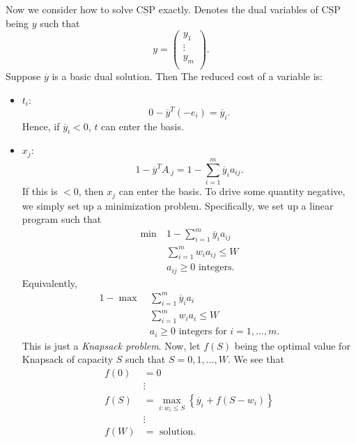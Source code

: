 \begin{problem}
\begin{answer}
	Now we consider how to solve \(\mathrm{\underline{CSP}}\) exactly. Denotes the dual variables of \(\mathrm{\underline{CSP}}\) being \(y\)
	such that
	\[
		y = \begin{pmatrix}
			y_1    \\
			\vdots \\
			y_{m}  \\
		\end{pmatrix}.
	\]
	Suppose \(\overline{y}\) is a basic dual solution. Then The reduced cost of a variable is:
	\begin{itemize}
		\item \(t_{i}\):
		      \[
			      0 - \overline{y}^{T}(-e_{i}) = \overline{y}_{i}.
		      \]
		      Hence, if \(\overline{y}_{i}<0\), \(t\) can enter the basis.
		\item \(x_{j}\):
		      \[
			      1 - \overline{y}^{T}A_{\cdot j} = 1 - \sum\limits_{i=1}^{m} \overline{y}_{i}a_{ij}.
		      \]
		      If this is \(<0\), then \(x_{j}\) can enter the basis. To drive some quantity negative, we simply set up a minimization problem.
		      Specifically, we set up a linear program such that
		      \begin{align*}
			      \min~ & 1 - \sum\limits_{i=1}^{m} \overline{y}_{i}a_{ij} \\
			            & \sum\limits_{i=1}^{m} w_{i}a_{ij}\leq W          \\
			            & a_{ij}\geq 0 \text{ integers}.
		      \end{align*}
		      Equivalently,
		      \begin{align*}
			      1 - \max~ & \sum\limits_{i=1}^{m} \overline{y}_{i}a_{i}         \\
			                & \sum\limits_{i=1}^{m} w_{i}a_{i}\leq W              \\
			                & a_{i}\geq 0 \text{ integers for }i = 1, \ldots , m.
		      \end{align*}
		      This is just a \emph{Knapsack problem}. Now, let \(f(S)\) being the optimal value for Knapsack of capacity \(S\) such that
		      \(S = 0, 1, \ldots , W\). We see that
		      \[
			      \begin{split}
				      f(0) &= 0\\
				      &\vdots\\
				      f(S) &= \max_{i\colon w_{i}\leq S}\left\{ \overline{y}_{i} + f(S - w_{i})\right\}\\
				      &\vdots\\
				      f(W) &= \text{ solution}.\\

\end{split}\]
\end{itemize}
\end{answer}
\end{problem}
